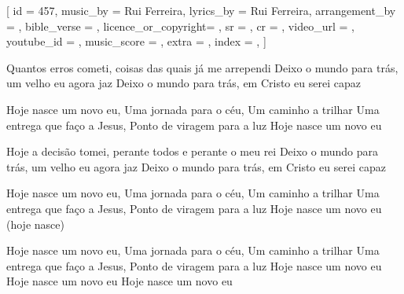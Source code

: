 [
    id                  = {457},
    music_by            = {Rui Ferreira}, %
    lyrics_by           = {Rui Ferreira}, %
    arrangement_by      = {}, %
    bible_verse         = {},
    licence_or_copyright= {},
    sr                  = {},
    cr                  = {},
    video_url           = {}, %
    youtube_id          = {}, %
    music_score         = {}, %
    extra               = {},
    index               = {},
]

\beginverse
Quantos erros cometi, coisas das quais já me arrependi
Deixo o mundo para trás, um velho eu agora jaz
Deixo o mundo para trás, em Cristo eu serei capaz
\endverse

\beginchorus
Hoje nasce um novo eu, 
Uma jornada para o céu,
Um caminho a trilhar
Uma entrega que faço a Jesus, 
Ponto de viragem para a luz
Hoje nasce um novo eu
\endchorus

\beginverse
Hoje a decisão tomei, perante todos e perante o meu rei
Deixo o mundo para trás, um velho eu agora jaz
Deixo o mundo para trás, em Cristo eu serei capaz
\endverse

\beginchorus
Hoje nasce um novo eu, 
Uma jornada para o céu,
Um caminho a trilhar
Uma entrega que faço a Jesus,  
Ponto de viragem para a luz
Hoje nasce um novo eu (hoje nasce)
\endchorus

\beginchorus
Hoje nasce um novo eu, 
Uma jornada para o céu,
Um caminho a trilhar
Uma entrega que faço a Jesus, 
Ponto de viragem para a luz
Hoje nasce um novo eu
Hoje nasce um novo eu
Hoje nasce um novo eu
\endchorus

\endsong

